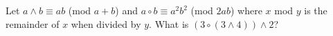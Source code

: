 Let $a \wedge b \equiv ab$ (mod $a + b$) and $a \circ b \equiv a^2b^2$ (mod $2ab$) where $x$ mod $y$ is the remainder of $x$ when divided by $y$. What is $(3 \circ (3 \wedge  4)) \wedge 2$?
